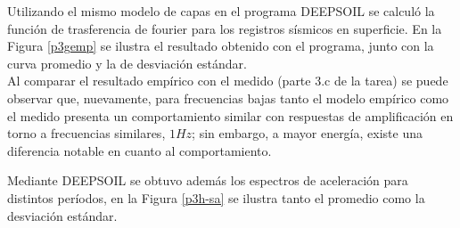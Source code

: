 Utilizando el mismo modelo de capas en el programa DEEPSOIL se calculó la función de trasferencia de fourier para los registros sísmicos en superficie. En la Figura \ref{p3gemp} se ilustra el resultado obtenido con el programa, junto con la curva promedio y la de desviación estándar. \\

Al comparar el resultado empírico con el medido (parte 3.c de la tarea) se puede observar que, nuevamente, para frecuencias bajas tanto el modelo empírico como el medido presenta un comportamiento similar con respuestas de amplificación en torno a frecuencias similares, $1Hz$; sin embargo, a mayor energía, existe una diferencia notable en cuanto al comportamiento.



\newpage
Mediante DEEPSOIL se obtuvo además los espectros de aceleración para distintos períodos, en la Figura \ref{p3h-sa} se ilustra tanto el promedio como la desviación estándar.

